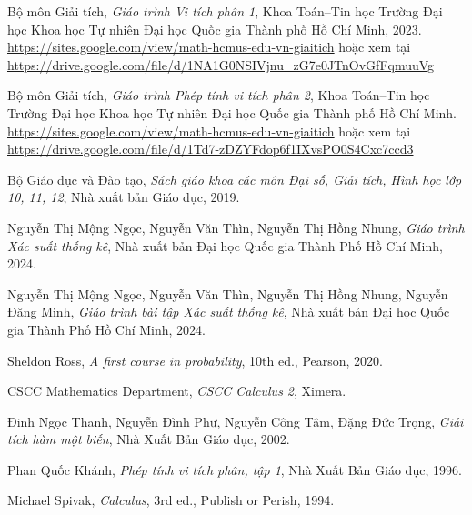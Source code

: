 \begin{thebibliography}{NTNM24-BT} %

Bộ môn Giải tích, \textit{Giáo trình Vi tích phân 1}, Khoa Toán–Tin học Trường Đại học Khoa học Tự nhiên Đại học Quốc gia Thành phố Hồ Chí Minh, 2023.
\newblock \url{https://sites.google.com/view/math-hcmus-edu-vn-giaitich}
hoặc xem tại
\newblock
\url{https://drive.google.com/file/d/1NA1G0NSIVjnu_zG7e0JTnOvGfFqmuuVg}

Bộ môn Giải tích, \textit{Giáo trình Phép tính vi tích phân 2}, Khoa Toán–Tin học Trường Đại học Khoa học Tự nhiên Đại học Quốc gia Thành phố Hồ Chí Minh.
\newblock \url{https://sites.google.com/view/math-hcmus-edu-vn-giaitich}
hoặc xem tại
\newblock
\url{https://drive.google.com/file/d/1Td7-zDZYFdop6f1IXvsPO0S4Cxc7ccd3}

Bộ Giáo dục và Đào tạo, \textit{Sách giáo khoa các môn Đại số, Giải tích, Hình học lớp 10, 11, 12}, Nhà xuất bản Giáo dục, 2019.


Nguyễn Thị Mộng Ngọc, Nguyễn Văn Thìn, Nguyễn Thị Hồng Nhung, \textit{Giáo trình Xác suất thống kê}, Nhà xuất bản Đại học Quốc gia Thành Phố Hồ Chí Minh, 2024.

Nguyễn Thị Mộng Ngọc, Nguyễn Văn Thìn, Nguyễn Thị Hồng Nhung, Nguyễn Đăng Minh, \textit{Giáo trình bài tập Xác suất thống kê}, Nhà xuất bản Đại học Quốc gia Thành Phố Hồ Chí Minh, 2024.

Sheldon Ross, \textit{A first course in probability}, 10th ed., Pearson, 2020.

CSCC Mathematics Department, \textit{CSCC Calculus 2}, Ximera.

Đinh Ngọc Thanh, Nguyễn Đình Phư, Nguyễn Công Tâm, Đặng Đức Trọng, \textit{Giải tích hàm một biến}, Nhà Xuất Bản Giáo dục, 2002.

Phan Quốc Khánh, \textit{Phép tính vi tích phân, tập 1}, Nhà Xuất Bản Giáo dục, 1996.

Michael Spivak, \textit{Calculus}, 3rd ed., Publish or Perish, 1994.

\end{thebibliography}
